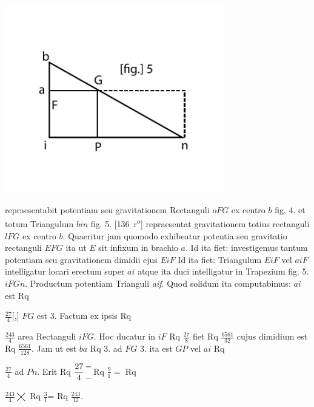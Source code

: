 \begin{minipage}[t]{0.5\textwidth}
\includegraphics[width=0.72\textwidth]{images/LH037,05_135-d5.pdf}
\end{minipage}
\pend
\count{}
\vspace{1.5em}
\pstart\noindent {} repraesentabit potentiam seu gravitationem Rectanguli $oFG$ ex centro $b$ fig. 4. et totum Triangulum $bin$ fig. 5.
[136~r\textsuperscript{o}]
repraesentat gravitationem totius rectanguli $lFG$  ex centro $b$. Quaeritur jam quomodo exhibeatur potentia seu gravitatio rectanguli $EFG$ 
ita ut $E$ sit infixum in brachio\protect{} $a$. Id ita fiet: investigemus tantum potentiam seu gravitationem dimidii ejus $EiF$  Id ita fiet: Triangulum $EiF$ vel $aiF$  intelligatur locari erectum super $ai$  atque ita duci intelligatur in Trapezium fig. 5. $iFGn$. Productum  
potentiam Trianguli \textit{aif}. Quod solidum ita computabimus: $ai$
 est Rq \protect\rule[-4mm]{0mm}{10mm}$\displaystyle\frac{27}{4}$[,] $FG$ est 3. Factum ex ipsis Rq \protect\rule[-4mm]{0mm}{10mm}$\displaystyle\frac{243}{4}$ area Rectanguli $iFG$. Hoc ducatur in $iF$ Rq $\displaystyle\frac{27}{8}$ fiet Rq $\displaystyle\frac{6561}{32}$ cujus dimidium est Rq $\displaystyle\frac{6561}{128}$. Jam ut est $ba$ Rq 3. ad $FG$ 3. ita est  $GP$ vel $ai$ Rq \protect\rule[-4mm]{0mm}{10mm}$\displaystyle\frac{27}{4}$ ad $Pn$. Erit Rq $\displaystyle\frac{27}{4}\efrac{-}{-}$Rq $\displaystyle\frac{9}{1}=$ Rq \protect\rule[-4mm]{0mm}{10mm}$\displaystyle\frac{243}{4}\bigtimes$ Rq $\displaystyle\frac{3}{1}$= Rq $\displaystyle\frac{243}{12}$. 
